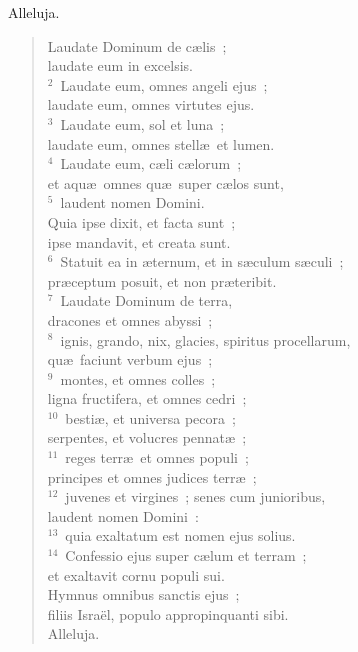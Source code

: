 \bchapter
\lettrine[lines=3,image=true,loversize=0.05,lraise=-0.03]{A}{}lleluja. \begin{flushleft}\begin{verse}\vspace{6pt}Laudate Dominum de c\ae lis~;\\ laudate eum in excelsis.\\
${}^{2}$~Laudate eum, omnes angeli ejus~;\\ laudate eum, omnes virtutes ejus.\\
${}^{3}$~Laudate eum, sol et luna~;\\ laudate eum, omnes stell\ae\ et lumen.\\
${}^{4}$~Laudate eum, c\ae li c\ae lorum~;\\ et aqu\ae\ omnes qu\ae\ super c\ae los sunt,\\
${}^{5}$~laudent nomen Domini.\\ Quia ipse dixit, et facta sunt~;\\ ipse mandavit, et creata sunt.\\
${}^{6}$~Statuit ea in \ae ternum, et in s\ae culum s\ae culi~;\\ pr\ae ceptum posuit, et non pr\ae teribit.\\
${}^{7}$~Laudate Dominum de terra,\\ dracones et omnes abyssi~;\\
${}^{8}$~ignis, grando, nix, glacies, spiritus procellarum,\\ qu\ae\ faciunt verbum ejus~;\\
${}^{9}$~montes, et omnes colles~;\\ ligna fructifera, et omnes cedri~;\\
${}^{10}$~besti\ae , et universa pecora~;\\ serpentes, et volucres pennat\ae~;\\
${}^{11}$~reges terr\ae\ et omnes populi~;\\ principes et omnes judices terr\ae~;\\
${}^{12}$~juvenes et virgines~; senes cum junioribus,\\ laudent nomen Domini~:\\
${}^{13}$~quia exaltatum est nomen ejus solius.\\
${}^{14}$~Confessio ejus super c\ae lum et terram~;\\ et exaltavit cornu populi sui.\\ Hymnus omnibus sanctis ejus~;\\ filiis Isra\"el, populo appropinquanti sibi.\\ Alleluja.\end{verse}\end{flushleft}



